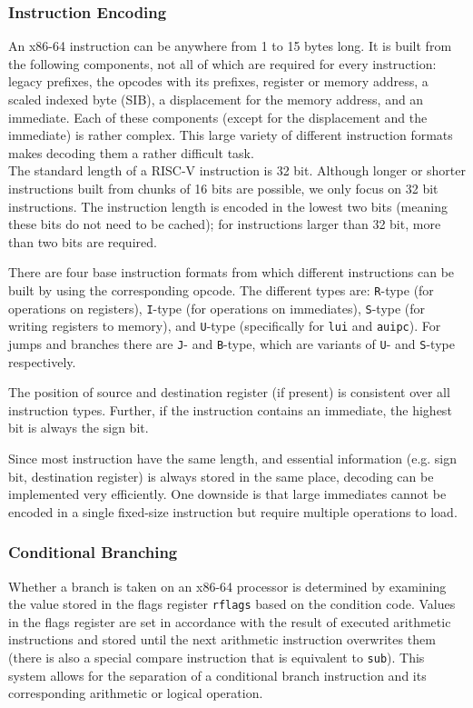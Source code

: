 \subsubsection{Instruction Encoding}
An x86-64 instruction can be anywhere from 1 to 15 bytes long. It is built from the following components, not all of which are required for every instruction: legacy prefixes, the opcodes with its prefixes, register or memory address, a scaled indexed byte (SIB), a displacement for the memory address, and an immediate. Each of these components (except for the displacement and the immediate) is rather complex. This large variety of different instruction formats makes decoding them a rather difficult task.\\

\noindent The standard length of a RISC-V instruction is 32 bit. Although longer or shorter instructions built from chunks of 16 bits are possible, we only focus on 32 bit instructions. The instruction length is encoded in the lowest two bits (meaning these bits do not need to be cached); for instructions larger than 32 bit, more than two bits are required. 

There are four base instruction formats from which different instructions can be built by using the corresponding opcode. The different types are: \texttt{R}-type (for operations on registers), \texttt{I}-type (for operations on immediates), \texttt{S}-type (for writing registers to memory), and \texttt{U}-type (specifically for \texttt{lui} and \texttt{auipc}). For jumps and branches there are \texttt{J}- and \texttt{B}-type, which are variants of \texttt{U}- and \texttt{S}-type respectively.

The position of source and destination register (if present) is consistent over all instruction types. Further, if the instruction contains an immediate, the highest bit is always the sign bit.

Since most instruction have the same length, and essential information (e.g. sign bit, destination register) is always stored in the same place, decoding can be implemented very efficiently. One downside is that large immediates cannot be encoded in a single fixed-size instruction but require multiple operations to load.

\subsubsection{Conditional Branching}
Whether a branch is taken on an x86-64 processor is determined by examining the value stored in the flags register \texttt{rflags} based on the condition code. Values in the flags register are set in accordance with the result of executed arithmetic instructions and stored until the next arithmetic instruction overwrites them (there is also a special compare instruction that is equivalent to \texttt{sub}). This system allows for the separation of a conditional branch instruction and its corresponding arithmetic or logical operation.

